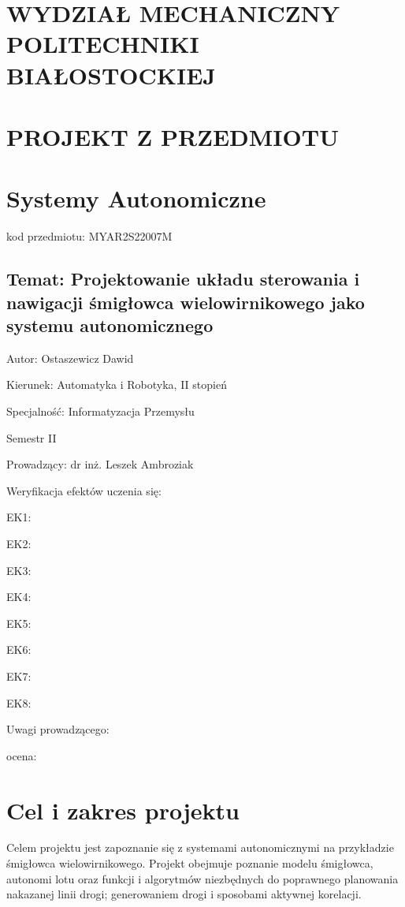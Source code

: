 \documentclass[polish,11pt,a4paper]{article}
\begin{document}
\centering
\section*{WYDZIAŁ MECHANICZNY POLITECHNIKI BIAŁOSTOCKIEJ}
\section*{PROJEKT Z PRZEDMIOTU}
\section*{Systemy Autonomiczne}
\large
kod przedmiotu: MYAR2S22007M
\subsection*{Temat: Projektowanie układu sterowania i nawigacji
śmigłowca wielowirnikowego jako systemu
autonomicznego }
\vspace{2cm}
\raggedright
Autor: Ostaszewicz Dawid

Kierunek: Automatyka i Robotyka, II stopień

Specjalność: Informatyzacja Przemysłu

Semestr II

Prowadzący: dr inż. Leszek Ambroziak
\vspace{2cm}

Weryfikacja efektów uczenia się:

EK1: \dotso

EK2: \dotso

EK3: \dotso

EK4: \dotso

EK5: \dotso

EK6: \dotso

EK7: \dotso

EK8: \dotso

Uwagi prowadzącego:
\vspace{3cm}

ocena: \dotso
\clearpage
\justifying
\section*{Cel i zakres projektu}
Celem projektu jest zapoznanie się z systemami autonomicznymi na przykładzie śmigłowca
wielowirnikowego. Projekt obejmuje poznanie modelu śmigłowca, autonomi lotu oraz funkcji
i algorytmów niezbędnych do poprawnego planowania nakazanej linii drogi; generowaniem
drogi i sposobami aktywnej korelacji. 
\end{document}
